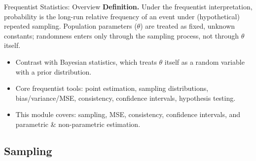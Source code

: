 \documentclass[11pt,aspectratio=169]{beamer}
\newcommand{\Def}[1]{\textbf{Definition.} #1}
\begin{document}
\begin{frame}{Frequentist Statistics: Overview}
\Def{Under the frequentist interpretation, probability is the long-run
relative frequency of an event under (hypothetical) repeated sampling.
Population parameters ($\theta$) are treated as fixed, unknown constants;
randomness enters only through the sampling process, not through
$\theta$ itself.}
\begin{itemize}
    \item Contrast with Bayesian statistics, which treats $\theta$ itself as
          a random variable with a prior distribution.
    \item Core frequentist tools: point estimation, sampling distributions,
          bias/variance/MSE, consistency, confidence intervals, hypothesis
          testing.
    \item This module covers: sampling, MSE, consistency, confidence
          intervals, and parametric \& non-parametric estimation.
\end{itemize}
\end{frame}

\subsection{Sampling}
\end{document}
